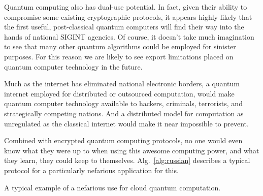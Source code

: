 \documentclass[aps,rmp,twocolumn,amsmath,amssymb,nofootinbib,superscriptaddress,longbibliography,floatfix,table-of-contents,eqsecnum]{revtex4-1}
\begin{document}
Quantum computing also has dual-use potential. In fact, given their ability to compromise some existing cryptographic protocols, it appears highly likely that the first useful, post-classical quantum computers will find their way into the hands of national SIGINT agencies. Of course, it doesn't take much imagination to see that many other quantum algorithms could be employed for sinister purposes. For this reason we are likely to see export limitations placed on quantum computer technology in the future.

Much as the internet has eliminated national electronic borders, a quantum internet employed for distributed or outsourced computation, would make quantum computer technology available to hackers, criminals, terrorists, and strategically competing nations. And a distributed model for computation as unregulated as the classical internet would make it near impossible to prevent.

Combined with encrypted quantum computing protocols, no one would even know what they were up to when using this awesome computing power, and what they learn, they could keep to themselves. Alg.~\ref{alg:russian} describes a typical protocol for a particularly nefarious application for this.

\begin{table}[!htb]
\caption{A typical example of a nefarious use for cloud quantum computation.} \label{alg:russian}
\end{table}
\end{document}
